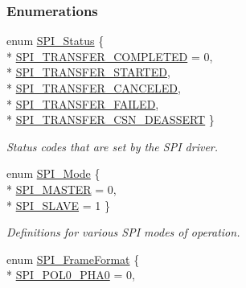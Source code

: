 \subsubsection*{Enumerations}
\begin{DoxyCompactItemize}
\item 
enum \hyperlink{_s_p_i_8h_a913c57c335166de9caa54b7eb9ad95fb}{S\+P\+I\+\_\+\+Status} \{ \\*
\hyperlink{_s_p_i_8h_a913c57c335166de9caa54b7eb9ad95fbabb35466595b950df7e3e3d880336502b}{S\+P\+I\+\_\+\+T\+R\+A\+N\+S\+F\+E\+R\+\_\+\+C\+O\+M\+P\+L\+E\+T\+E\+D} = 0, 
\\*
\hyperlink{_s_p_i_8h_a913c57c335166de9caa54b7eb9ad95fbad5266453aecb2fdedc0c23cd90921627}{S\+P\+I\+\_\+\+T\+R\+A\+N\+S\+F\+E\+R\+\_\+\+S\+T\+A\+R\+T\+E\+D}, 
\\*
\hyperlink{_s_p_i_8h_a913c57c335166de9caa54b7eb9ad95fba78957da92681e8400d84d9d3ede55836}{S\+P\+I\+\_\+\+T\+R\+A\+N\+S\+F\+E\+R\+\_\+\+C\+A\+N\+C\+E\+L\+E\+D}, 
\\*
\hyperlink{_s_p_i_8h_a913c57c335166de9caa54b7eb9ad95fbac01b83da31c34da13025a5b987ef013f}{S\+P\+I\+\_\+\+T\+R\+A\+N\+S\+F\+E\+R\+\_\+\+F\+A\+I\+L\+E\+D}, 
\\*
\hyperlink{_s_p_i_8h_a913c57c335166de9caa54b7eb9ad95fbaa363cddc53c1f44ca73aa661e6535816}{S\+P\+I\+\_\+\+T\+R\+A\+N\+S\+F\+E\+R\+\_\+\+C\+S\+N\+\_\+\+D\+E\+A\+S\+S\+E\+R\+T}
 \}
\begin{DoxyCompactList}\small\item\em Status codes that are set by the S\+P\+I driver. \end{DoxyCompactList}\item 
enum \hyperlink{_s_p_i_8h_a60a7e3d74577b38aa79ea6983362f942}{S\+P\+I\+\_\+\+Mode} \{ \\*
\hyperlink{_s_p_i_8h_a60a7e3d74577b38aa79ea6983362f942a84379dc90398ca075038c8d5ee465f6a}{S\+P\+I\+\_\+\+M\+A\+S\+T\+E\+R} = 0, 
\\*
\hyperlink{_s_p_i_8h_a60a7e3d74577b38aa79ea6983362f942abc98c1546fe12d3fceb1f86cf670faa9}{S\+P\+I\+\_\+\+S\+L\+A\+V\+E} = 1
 \}
\begin{DoxyCompactList}\small\item\em Definitions for various S\+P\+I modes of operation. \end{DoxyCompactList}\item 
enum \hyperlink{_s_p_i_8h_a4e1f33555dfa8147205af5b266f3a489}{S\+P\+I\+\_\+\+Frame\+Format} \{ \\*
\hyperlink{_s_p_i_8h_a4e1f33555dfa8147205af5b266f3a489a0396d8c01166ff94e94e0c200261eba3}{S\+P\+I\+\_\+\+P\+O\+L0\+\_\+\+P\+H\+A0} = 0, 

\end{DoxyCompactItemize}
